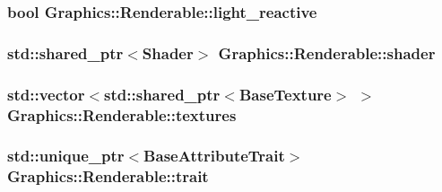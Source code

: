 \subsubsection[{light\+\_\+reactive}]{\setlength{\rightskip}{0pt plus 5cm}bool Graphics\+::\+Renderable\+::light\+\_\+reactive\hspace{0.3cm}{\ttfamily [private]}}\label{class_graphics_1_1_renderable_a4a0fd8d55a1881c2b41e854ddb78366a}
\hypertarget{class_graphics_1_1_renderable_a6c951dfc9a00d3f3f79550112d0f40e3}{}
\subsubsection[{shader}]{\setlength{\rightskip}{0pt plus 5cm}std\+::shared\+\_\+ptr$<${\bf Shader}$>$ Graphics\+::\+Renderable\+::shader\hspace{0.3cm}{\ttfamily [private]}}\label{class_graphics_1_1_renderable_a6c951dfc9a00d3f3f79550112d0f40e3}
\hypertarget{class_graphics_1_1_renderable_ac3a09a4fbb226022792d8abf07ff549a}{}
\subsubsection[{textures}]{\setlength{\rightskip}{0pt plus 5cm}std\+::vector$<$std\+::shared\+\_\+ptr$<${\bf Base\+Texture}$>$ $>$ Graphics\+::\+Renderable\+::textures\hspace{0.3cm}{\ttfamily [private]}}\label{class_graphics_1_1_renderable_ac3a09a4fbb226022792d8abf07ff549a}
\hypertarget{class_graphics_1_1_renderable_a27f39fbb4866ccfc83f0662a59c03020}{}
\subsubsection[{trait}]{\setlength{\rightskip}{0pt plus 5cm}std\+::unique\+\_\+ptr$<${\bf Base\+Attribute\+Trait}$>$ Graphics\+::\+Renderable\+::trait\hspace{0.3cm}{\ttfamily [private]}}\label{class_graphics_1_1_renderable_a27f39fbb4866ccfc83f0662a59c03020}
\hypertarget{class_graphics_1_1_renderable_aabfa91ebff7b10decd54119d663044ef}{}

